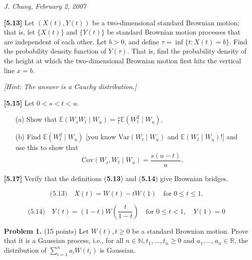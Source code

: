 \documentclass{article}
\begin{document}
\hfill \textit{J. Chang, February 2, 2007}




\textbf{[5.13]} Let $(X(t), Y(t))$ be a two-dimensional standard Brownian motion; that is, let $\{X(t)\}$ and $\{Y(t)\}$ be standard Brownian motion processes that are independent of each other. Let $b > 0$, and define $\tau = \inf\{t : X(t) = b\}$. Find the probability density function of $Y(\tau)$. That is, find the probability density of the height at which the two-dimensional Brownian motion first hits the vertical line $x = b$.

\textit{[Hint: The answer is a Cauchy distribution.]}




\textbf{[5.15]} Let $0 < s < t < u$.

\begin{enumerate}
    \item[(a)] Show that $\mathbb{E}(W_s W_t \mid W_u) = \frac{s}{t} \mathbb{E}(W_t^2 \mid W_u)$.
    \item[(b)] Find $\mathbb{E}(W_t^2 \mid W_u)$ [you know $\mathrm{Var}(W_t \mid W_u)$ and $\mathbb{E}(W_t \mid W_u)$!] and use this to show that
    \[
    \mathrm{Cov}(W_s, W_t \mid W_u) = \frac{s(u-t)}{u}.
    \]
\end{enumerate}






\textbf{[5.17]} Verify that the definitions (\textbf{5.13}) and (\textbf{5.14}) give Brownian bridges.


\[
\text{(5.13)} \quad X(t) = W(t) - tW(1) \quad \text{for } 0 \leq t \leq 1.
\]


\[
\text{(5.14)} \quad Y(t) = (1 - t)W\left( \frac{t}{1 - t} \right) \quad \text{for } 0 \leq t < 1, \quad Y(1) = 0
\]








\textbf{Problem 1.} (15 points) 
Let $W(t), t \geq 0$ be a standard
Brownian motion. Prove that it is a Gaussian process, i.e., for all
$n \in \mathbb{N}, t_1, \dots, t_n \geq 0$ and $a_1, \dots, a_n \in
\mathbb{R}$, the distribution of $\sum_{i=1}^{n} a_i W(t_i)$ is
Gaussian.
\end{document}

